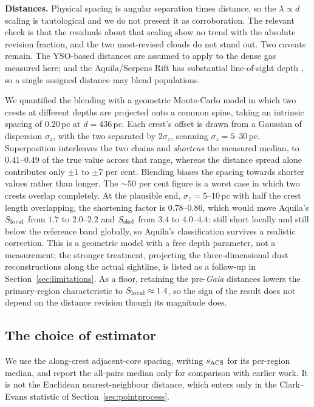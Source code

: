 \documentclass[usenatbib,twoside,twocolumn]{mnras}
\begin{document}
\smallskip\noindent\textbf{Distances.} Physical spacing is angular separation times distance, so the $\lambda\propto d$ scaling is tautological and we do not present it as corroboration. The relevant check is that the residuals about that scaling show no trend with the absolute revision fraction, and the two most-revised clouds do not stand out. Two caveats remain. The YSO-based distances \citep{Zhang2023} are assumed to apply to the dense gas measured here; and the Aquila/Serpens Rift has substantial line-of-sight depth \citep{Zucker2020,Green2024}, so a single assigned distance may blend populations.

We quantified the blending with a geometric Monte-Carlo model in which two crests at different depths are projected onto a common spine, taking an intrinsic spacing of $0.20$\,pc at $d=436$\,pc. Each crest's offset is drawn from a Gaussian of dispersion $\sigma_z$, with the two separated by $2\sigma_z$, scanning $\sigma_z=5$--$30$\,pc. Superposition interleaves the two chains and \emph{shortens} the measured median, to $0.41$--$0.49$ of the true value across that range, whereas the distance spread alone contributes only $\pm1$ to $\pm7$ per cent. Blending biases the spacing towards shorter values rather than longer. The $\sim50$ per cent figure is a worst case in which two crests overlap completely. At the plausible end, $\sigma_z=5$--$10$\,pc with half the crest length overlapping, the shortening factor is $0.78$--$0.86$, which would move Aquila's $S_{\rm local}$ from $1.7$ to $2.0$--$2.2$ and $S_{\rm skel}$ from $3.4$ to $4.0$--$4.4$: still short locally and still below the reference band globally, so Aquila's classification survives a realistic correction. This is a geometric model with a free depth parameter, not a measurement; the stronger treatment, projecting the three-dimensional dust reconstructions along the actual sightline, is listed as a follow-up in Section~\ref{sec:limitations}. As a floor, retaining the pre-\textit{Gaia} distances lowers the primary-region characteristic to $S_{\rm local}\approx1.4$, so the sign of the result does not depend on the distance revision though its magnitude does.




\subsection{The choice of estimator}
\label{sec:statistics}

We use the along-crest adjacent-core spacing, writing $s_{\rm ACS}$ for its per-region median, and report the all-pairs median only for comparison with earlier work. It is not the Euclidean nearest-neighbour distance, which enters only in the Clark--Evans statistic of Section~\ref{sec:pointprocess}.
\end{document}
